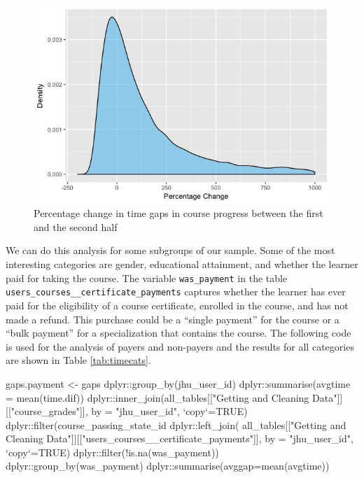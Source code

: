 \begin{figure}[htbp]
    \centering
    \includegraphics[scale=0.5]{timegapchange}
    \caption{Percentage change in time gaps in course progress between the first and the second half}
    \label{figure:timegapchange}
\end{figure}

We can do this analysis for some subgroups of our sample. Some of the
most interesting categories are gender, educational attainment, and
whether the learner paid for taking the course. The variable
\texttt{was\_payment} in the table
\texttt{users\_courses\_\_certificate\_payments} captures whether the
learner has ever paid for the eligibility of a course certificate,
enrolled in the course, and has not made a refund. This purchase could
be a ``single payment'' for the course or a ``bulk payment'' for a
specialization that contains the course. The following code is used for
the analysis of payers and non-payers and the results for all categories
are shown in Table \ref{tab:timecats}.

\begin{Schunk}
\begin{Sinput}
gaps.payment <- gaps %
    dplyr::group_by(jhu_user_id) %
    dplyr::summarise(avgtime = mean(time.dif)) %
    dplyr::inner_join(all_tables[["Getting and Cleaning Data"]][["course_grades"]],
                      by = "jhu_user_id", `copy`=TRUE) %
    dplyr::filter(course_passing_state_id %
    dplyr::left_join(
        all_tables[["Getting and Cleaning Data"]][["users_courses__certificate_payments"]],
        by = "jhu_user_id", `copy`=TRUE) %
    dplyr::filter(!is.na(was_payment)) %
    dplyr::group_by(was_payment) %
    dplyr::summarise(avggap=mean(avgtime))
\end{Sinput}
\end{Schunk}

